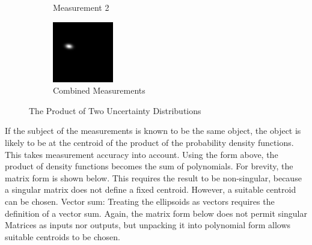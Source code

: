 \documentclass[a4paper, 11pt, titlepage]{article}
\begin{document}
\begin{figure}
\begin{subfigure}{.3\textwidth}
        \caption{Measurement 2}
        \label{fig:uncProdsub2}
      \end{subfigure}
      \begin{subfigure}{.3\textwidth}
        \centering
        \includegraphics[width=.8\linewidth]{images/GaussianLine3.png}
        \caption{Combined Measurements}
        \label{fig:uncProdsub3}
      \end{subfigure}
      \caption{The Product of Two Uncertainty Distributions}
      \label{fig:uncProd}
      \end{figure}
      If the subject of the measurements is known to be the same object, the object is likely to be at the centroid of the product of the probability density functions.  This takes measurement accuracy into account.
      Using the form above, the product of density functions becomes the sum of polynomials.
        For brevity, the matrix form is shown below. This requires the result to be non-singular, because a singular matrix does not define a fixed centroid. However, a suitable centroid can be chosen.
      Vector sum:
        Treating the ellipsoids as vectors requires the definition of a vector sum.
        Again, the matrix form below does not permit singular Matrices as inputs nor outputs, but unpacking it into polynomial form allows suitable centroids to be chosen.
\end{document}
